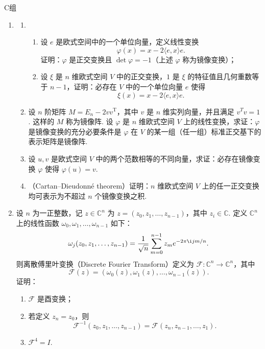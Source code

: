 \centerline{\heiti C组}
\begin{enumerate}
    \item \label{item:24:镜像变换}
        \begin{enumerate}
            \item \begin{enumerate}
                \item 设 $e$ 是欧式空间中的一个单位向量，定义线性变换
                        \[
                            \varphi(x) = x - 2\langle e, x \rangle e.
                        \]
                        证明：$\varphi$ 是正交变换且 $\det \varphi = -1$（上述 $\varphi$ 称为镜像变换）；
                \item 设 $\xi$ 是 $n$ 维欧式空间 $V$ 中的正交变换，$1$ 是 $\xi$ 的特征值且几何重数等于 $n - 1$，证明：必存在 $V$ 中的一个单位向量 $e$ 使得
                        \[
                            \xi(x) = x - 2\langle e, x \rangle e.
                        \]
            \end{enumerate}
            \item 设 $n$ 阶矩阵 $M = E_n - 2v v^{\mathrm{T}}$，其中 $v$ 是 $n$ 维实列向量，并且满足 $v^{T}v = 1$. 这样的 $M$ 称为镜像阵. 设 $\varphi$ 是 $n$ 维欧式空间 $V$ 上的线性变换，求证：$\varphi$ 是镜像变换的充分必要条件是 $\varphi$ 在 $V$ 的某一组（任一组）标准正交基下的表示矩阵是镜像阵.
            \item 设 $u, v$ 是欧式空间 $V$ 中的两个范数相等的不同向量，求证：必存在镜像变换 $\varphi$ 使得 $\varphi(u) = v$.
            \item （Cartan–Dieudonné theorem）证明：$n$ 维欧式空间 $V$ 上的任一正交变换均可表示为不超过 $n$ 个镜像变换之积.
        \end{enumerate}
    \item 设 $n$ 为一正整数，记 $z \in \mathbb{C}^n$ 为 $z = (z_0, z_1, \ldots, z_{n - 1})$，其中 $z_i \in \mathbb{C}$. 定义 $\mathbb{C}^n$ 上的线性函数 $\omega_0, \omega_1, \ldots, \omega_{n - 1}$ 如下：
            \[
                \omega_j(z_0, z_1, \ldots, z_{n - 1}) = \dfrac{1}{\sqrt{n}}\sum_{m = 0}^{n - 1}z_m e^{-2\pi \i jm/n}.
            \]
            则离散傅里叶变换（Discrete Fourier Transform）定义为 $\mathcal{F}: \mathbb{C}^n \to \mathbb{C}^n$，其中 \[ \mathcal{F}(z) = (\omega_0(z), \omega_1(z), \ldots, \omega_{n - 1}(z)). \]
            证明：
            \begin{enumerate}
                \item $\mathcal{F}$ 是酉变换；
                \item 若定义 $z_n = z_0$，则 \[ \mathcal{F}^{-1}(z_0, z_1, \ldots, z_{n - 1}) = \mathcal{F}(z_n, z_{n - 1}, \ldots, z_1). \]
                \item $\mathcal{F}^4 = I$.
            \end{enumerate}
\end{enumerate}
